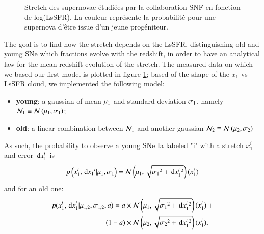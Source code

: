 \documentclass{aa}
\begin{document}
\begin{figure}[htbp!]
    \centering
    \caption{Stretch des supernovae étudiées par la collaboration SNF en
    fonction de log(LsSFR). La couleur représente la probabilité pour une
supernova d'être issue d'un jeune progéniteur.}
    \label{fig:mod_first}
\end{figure}

The goal is to find how the stretch depends on the LsSFR, distinguishing old and
young SNe which fractions evolve with the redshift, in order to have an
analytical law for the mean redshift evolution of the stretch. The measured data
on which we based our first model is plotted in figure \ref{fig:mod_first};
based of the shape of the $x_1$ vs LsSFR cloud, we implemented the following
model:
\begin{itemize}
    \item \textbf{young}: a gaussian of mean $\mu_1$ and standard deviation
        $\sigma_1$, namely $\mathcal{N}_1 \equiv \mathcal{N} \left(\mu_1,\sigma_1\right)$;
    \item \textbf{old}: a linear combination between $\mathcal{N}_1$ and another
        gaussian $\mathcal{N}_2 \equiv \mathcal{N} \left(\mu_2,\sigma_2\right)$
\end{itemize}
As such, the probability to observe a young SNe Ia labeled "i" with a stretch
$x_1^i$ and error $\,\mathrm{d} x_1^i$ is
\begin{equation}
    p \left(x_1^i, \,\mathrm{d} x_1{}^i|\mu_1,\sigma_1\right) = \mathcal{N} \left(\mu_1, \sqrt{\sigma_1{}^2 + \,\mathrm{d}
    x_1^i{}^2}\right)(x_1^i)
\end{equation}
and for an old one:
\begin{align}
    p(x_1^i, \,\mathrm{d} x_1^i | \mu_{1,2}, \sigma_{1,2}, a) = a & \times \mathcal{N} \left(\mu_1,
    \sqrt{\sigma_1{}^2 + \,\mathrm{d} x_1^i{}^{2}}\right) (x_1^i) \ + \\ (1-a) & \times \mathcal{N}
    \left(\mu_2, \sqrt{ \sigma_2{}^2 + \,\mathrm{d} x_1^i{}^{2}}\right) (x_1^i), \nonumber 
\end{align}
\end{document}
